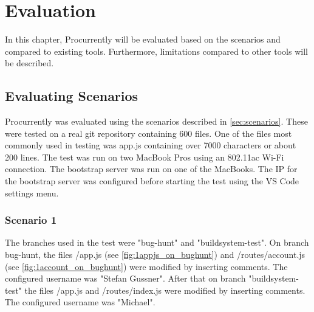 \chapter{Evaluation}
\label{sec:results}

In this chapter, Procurrently will be evaluated based on the scenarios and compared to existing tools.
Furthermore, limitations compared to other tools will be described.

\section{Evaluating Scenarios}
\label{sec:eval}

Procurrently was evaluated using the scenarios described in \autoref{sec:scenarios}.
These were tested on a real git repository containing 600 files. One of the files most commonly used in testing was app.js containing over 7000 characters or about 200 lines. The test was run on two MacBook Pros using an 802.11ac Wi-Fi connection.
The bootstrap server was run on one of the MacBooks. The IP for the bootstrap server was configured before starting the test using the VS Code settings menu. 

\subsection{Scenario 1}

The branches used in the test were "bug-hunt" and "buildsystem-test". On branch bug-hunt, the files /app.js (see \autoref{fig:1appjs_on_bughunt}) and /routes/account.js (see \autoref{fig:1account_on_bughunt}) were modified by inserting comments. The configured username was "Stefan Gussner". 
After that on branch "buildsystem-test" the files /app.js and /routes/index.js were modified by inserting comments. The configured username was "Michael".



